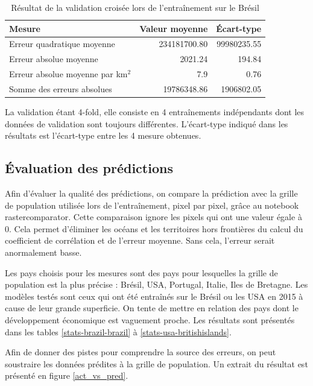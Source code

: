 \documentclass[a4paper, 11pt]{report}
\begin{document}
\begin{table}[h]
\centering
\caption{Résultat de la validation croisée lors de l'entraînement sur le Brésil}
\begin{tabular}{ l r r }
	\hline
	\textbf{Mesure} & \textbf{Valeur moyenne} & \textbf{Écart-type} \\
	\hline\hline
	Erreur quadratique moyenne & 234181700.80 & 99980235.55 \\
	\hline
	Erreur absolue moyenne & 2021.24 & 194.84 \\
	\hline
	Erreur absolue moyenne par km$^2$ & 7.9 & 0.76 \\
	\hline
	Somme des erreurs absolues & 19786348.86 & 1906802.05 \\
	\hline
\end{tabular}
\label{k-fold}
\end{table}

La validation étant 4-fold, elle consiste en 4 entraînements indépendants dont les données de validation sont toujours différentes. L'écart-type indiqué dans les résultats est l'écart-type entre les 4 mesure obtenues.

\subsection{Évaluation des prédictions}
Afin d'évaluer la qualité des prédictions, on compare la prédiction avec la grille de population \cite{sedac} utilisée lors de l'entraînement, pixel par pixel, grâce au notebook rastercomparator. Cette comparaison ignore les pixels qui ont une valeur égale à 0. Cela permet d'éliminer les océans et les territoires hors frontières du calcul du coefficient de corrélation et de l'erreur moyenne. Sans cela, l'erreur serait anormalement basse.

Les pays choisis pour les mesures sont des pays pour lesquelles la grille de population \cite{sedac} est la plus précise : Brésil, USA, Portugal, Italie, Iles de Bretagne. Les modèles testés sont ceux qui ont été entraînés sur le Brésil ou les USA en 2015 à cause de leur grande superficie. On tente de mettre en relation des pays dont le développement économique est vaguement proche. Les résultats sont présentés dans les tables \ref{stats-brazil-brazil} à \ref{stats-usa-britishislands}.

Afin de donner des pistes pour comprendre la source des erreurs, on peut soustraire les données prédites à la grille de population. Un extrait du résultat est présenté en figure \ref{act_vs_pred}.
\end{document}
